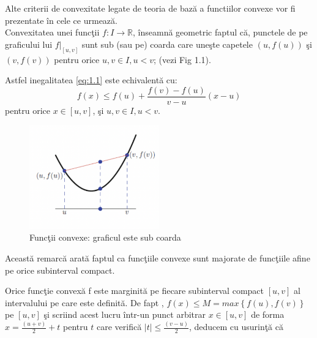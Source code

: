 \documentclass[a4paper,12pt,oneside]{report}
\begin{document}
Alte criterii de convexitate legate de teoria de baz\u{a} a func{t}iilor convexe vor fi prezentate \^{i}n cele ce urmeaz\u{a}.\\

Convexitatea unei func\c{t}ii \(f : I\rightarrow \mathbb{R}\), \^{i}nseamn\u{a} geometric faptul c\u{a}, punctele de pe graficului lui  \(f|_{\left [ u,v \right ]}\) sunt sub (sau pe) coarda care une\c{s}te capetele \(\left ( u , f {\left ( u \right )} \right )\)  \c{s}i \(\left ( v , f {\left ( v \right )} \right )\) pentru orice \(u, v \in I, u < v\);
(vezi Fig 1.1).

Astfel inegalitatea \ref{eq:1.1} este echivalent\u{a} cu:
\begin{displaymath}
  f\left ( x \right )\leq f\left ( u \right ) +\frac{f\left ( v \right )- f\left ( u \right )}{v - u}\left ( x - u \right ) \label{eq:1.2} \tag{1.2}
\end{displaymath}
pentru orice \(x\in \left [  u, v\right ]\), \c{s}i \(u, v \in I, u < v\).

\begin{figure}[htbp]
	\centering
	\includegraphics[width=0.5\textwidth]{fig1.1.png}
	\caption{ Func\c{t}ii convexe: graficul este sub coarda}
\end{figure}

Aceast\u{a} remarc\u{a} arat\u{a} faptul ca func\c{t}iile convexe sunt majorate de func\c{t}iile afine pe orice subinterval compact.

Orice func\c{t}ie convex\u{a} f este marginit\u{a} pe fiecare subinterval compact \(\left [ u , v \right ]\) al intervalului pe care este definit\u{a}. De fapt , \(f\left ( x \right ) \leq  M = max \left \{ f\left ( u \right ), f\left ( v \right ) \right \}\)  pe \(\left [ u , v \right ]\)  \c{s}i scriind acest lucru \^{i}ntr-un punct arbitrar \(x\in  \left [ u , v  \right ]\)  de forma  \(x= \frac{\left ( u + v \right )}{2} + t\) pentru  \(t\) care verific\u{a} \(\left | t \right |\leq \frac{\left ( v - u \right )}{2}\), deducem cu usurin\c{t}\u{a} c\u{a}
\end{document}

